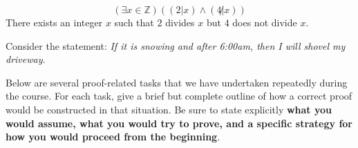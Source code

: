 \documentclass[addpoints]{exam}
\begin{document}
\begin{questions}
\begin{parts}
\begin{solution}
	\[ (\exists x \in  \mathbb{Z})((2 | x) \wedge (4 \not | x)) \]
	There exists an integer $x$ such that $2$ divides $x$ but $4$ does not divide $x$.
	
\end{solution}		
	\end{parts}
	
	

\question Consider the statement: 		\emph{If it is snowing and after 6:00am, then I will shovel my driveway.}




% 	




\question Below are several proof-related tasks that we have undertaken repeatedly during the course. For each task, give a brief but complete outline of how a correct proof would be constructed in that situation. Be sure to state explicitly \textbf{what you would assume,  what you would try to prove, and a  specific strategy for how you would proceed from the beginning}. 
	\begin{parts}

\end{parts}
\end{questions}
\end{document}
